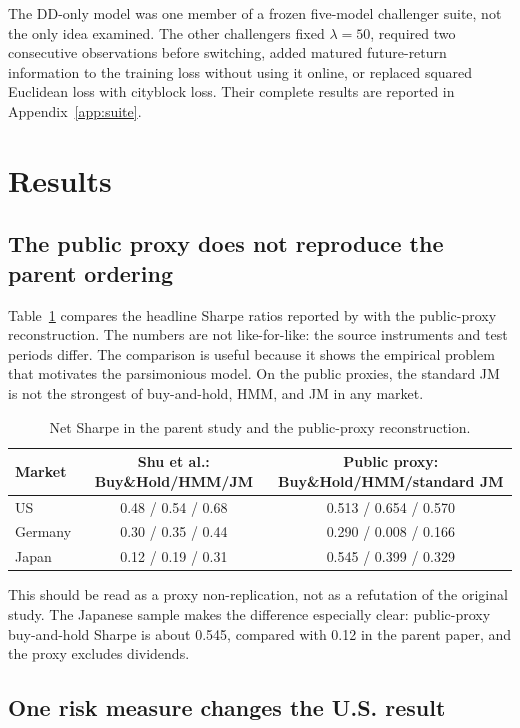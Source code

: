 \documentclass[11pt]{article}
\newcommand{\BH}{Buy\&Hold}
\begin{document}
The DD-only model was one member of a frozen five-model challenger suite, not the only idea examined. The other challengers fixed $\lambda=50$, required two consecutive observations before switching, added matured future-return information to the training loss without using it online, or replaced squared Euclidean loss with cityblock loss. Their complete results are reported in Appendix~\ref{app:suite}.

\section{Results}

\subsection{The public proxy does not reproduce the parent ordering}

Table~\ref{tab:parentproxy} compares the headline Sharpe ratios reported by \citet{shu2024} with the public-proxy reconstruction. The numbers are not like-for-like: the source instruments and test periods differ. The comparison is useful because it shows the empirical problem that motivates the parsimonious model. On the public proxies, the standard JM is not the strongest of buy-and-hold, HMM, and JM in any market.

\begin{table}[H]
\centering
\caption{Net Sharpe in the parent study and the public-proxy reconstruction.}
\label{tab:parentproxy}
\begin{tabular}{lcc}
\toprule
Market & Shu et al.: \BH{}/HMM/JM & Public proxy: \BH{}/HMM/standard JM \\
\midrule
US & 0.48 / 0.54 / 0.68 & 0.513 / 0.654 / 0.570 \\
Germany & 0.30 / 0.35 / 0.44 & 0.290 / 0.008 / 0.166 \\
Japan & 0.12 / 0.19 / 0.31 & 0.545 / 0.399 / 0.329 \\
\bottomrule
\end{tabular}
\end{table}

This should be read as a proxy non-replication, not as a refutation of the original study. The Japanese sample makes the difference especially clear: public-proxy buy-and-hold Sharpe is about 0.545, compared with 0.12 in the parent paper, and the proxy excludes dividends.

\subsection{One risk measure changes the U.S. result}
\end{document}
